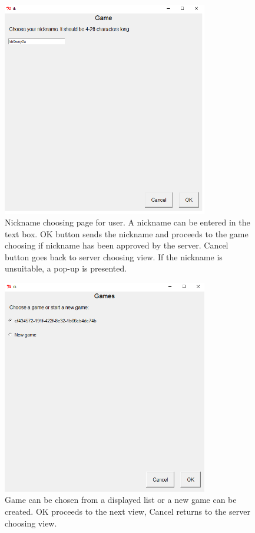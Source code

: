 \documentclass[]{article}
\begin{document}
\begin{figure}[!hbt]
	\centering
	\includegraphics[width=0.8\textwidth]{NickPage.png}
	\caption{Nickname choosing page for user. A nickname can be entered in the text box. OK button sends the nickname and proceeds to the game choosing if nickname has been approved by the server. Cancel button goes back to server choosing view. If the nickname is unsuitable, a pop-up is presented.}
	\label{fig:Nickpage}
\end{figure}

\begin{figure}[!hbt]
	\centering
	\includegraphics[width=0.8\textwidth]{ChooseGame.png}
	\caption{Game can be chosen from a displayed list or a new game can be created. OK proceeds to the next view, Cancel returns to the server choosing view.}
	\label{fig:Choosegame}
\end{figure}
\end{document}
